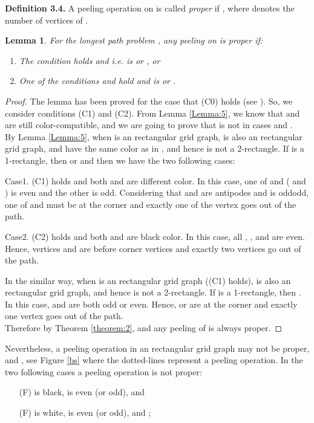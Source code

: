 \documentclass[preprint,12pt]{elsarticle}
\newtheorem{lem}{Lemma}[section]
\begin{document}
\noindent\textbf{Definition 3.4.} A peeling operation on  is
called \textit{proper} if
,
where  denotes the number of vertices of
.
\begin{lem} \label{Lemma:6} For the longest path problem , any peeling on  is proper if:
\begin{enumerate}
\item The condition  holds and  i.e.  is  or , or
\item One of the conditions  and  hold and  is  or .
\end{enumerate}
\end{lem}
\begin{proof}
The lemma has been proved for the case that (C0) holds (see
\cite{CST:AFAFCHPIM}). So, we consider conditions (C1) and (C2).
From Lemma \ref{Lemma:5}, we know that  and  are still
color-compatible, and we are
going to prove that  is not in cases  and .\\
By Lemma \ref{Lemma:5}, when  is an 
rectangular grid graph,  is also an  rectangular grid graph,  and  have the same color as in
, and hence  is not a 2-rectangle. If 
is a 1-rectangle, then  or  and then we
have the two following cases:\par Case1. (C1) holds and both  and
 are different color. In this case, one of  and 
( and ) is even and the other is odd. Considering that
 and  are antipodes and  is oddodd, one of 
and  must be at the corner and exactly one of the vertex goes out
of the path.
\par Case2. (C2) holds and both  and  are black color. In this case, all
, ,  and  are even. Hence, vertices 
and  are before corner vertices and exactly two vertices go out
of the path.\par In the similar way, when  is an  rectangular grid graph ((C1) holds),  is
also an  rectangular grid graph, and hence
 is not a 2-rectangle. If  is a
1-rectangle, then . In this case,  and 
are both odd or even. Hence,  or  are at the
corner and exactly one vertex goes out of the path. \\
Therefore by Theorem \ref{theorem:2},
 and any peeling of
 is always proper.
\end{proof}
Nevertheless, a peeling operation in an 
rectangular grid graph  may not be proper, and
, see Figure \ref{bs}
where the dotted-lines represent a peeling operation. In the two
following cases a peeling operation is not proper:
\begin{enumerate}
\item [(F)]  is black,  is even (or
odd),  and 
\item [(F)] is white,  is even (or odd),  and
;
\end{enumerate}
\end{document}
